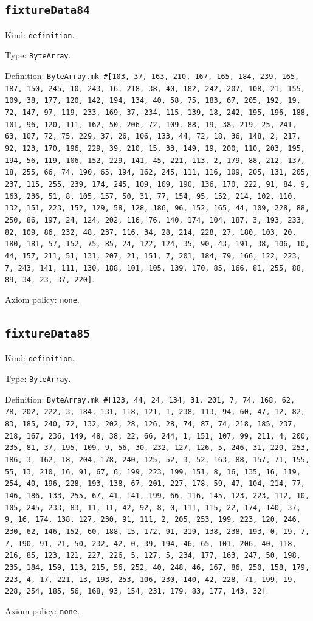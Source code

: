 \documentclass[11pt]{article}
\begin{document}
\subsection*{\texttt{fixtureData84}}
\noindent Kind: \texttt{definition}.\par
\noindent Type: \texttt{ByteArray}.\par
\noindent Definition: \texttt{ByteArray.mk \#[103, 37, 163, 210, 167, 165, 184, 239, 165, 187, 150, 245, 10, 243, 16, 218, 38, 40, 182, 242, 207, 108, 21, 155, 109, 38, 177, 120, 142, 194, 134, 40, 58, 75, 183, 67, 205, 192, 19, 72, 147, 97, 119, 233, 169, 37, 234, 115, 139, 18, 242, 195, 196, 188, 101, 96, 120, 111, 162, 50, 206, 72, 109, 88, 19, 38, 219, 25, 241, 63, 107, 72, 75, 229, 37, 26, 106, 133, 44, 72, 18, 36, 148, 2, 217, 92, 123, 170, 196, 229, 39, 210, 15, 33, 149, 19, 200, 110, 203, 195, 194, 56, 119, 106, 152, 229, 141, 45, 221, 113, 2, 179, 88, 212, 137, 18, 255, 66, 74, 190, 65, 194, 162, 245, 111, 116, 109, 205, 131, 205, 237, 115, 255, 239, 174, 245, 109, 109, 190, 136, 170, 222, 91, 84, 9, 163, 236, 51, 8, 105, 157, 50, 31, 77, 154, 95, 152, 214, 102, 110, 132, 151, 223, 152, 129, 58, 128, 186, 96, 152, 165, 44, 109, 228, 88, 250, 86, 197, 24, 124, 202, 116, 76, 140, 174, 104, 187, 3, 193, 233, 82, 109, 86, 232, 48, 237, 116, 34, 28, 214, 228, 27, 180, 103, 20, 180, 181, 57, 152, 75, 85, 24, 122, 124, 35, 90, 43, 191, 38, 106, 10, 44, 157, 211, 51, 131, 207, 21, 151, 7, 201, 184, 79, 166, 122, 223, 7, 243, 141, 111, 130, 188, 101, 105, 139, 170, 85, 166, 81, 255, 88, 89, 34, 23, 37, 220]}.\par
\noindent Axiom policy: \texttt{none}.\par
\subsection*{\texttt{fixtureData85}}
\noindent Kind: \texttt{definition}.\par
\noindent Type: \texttt{ByteArray}.\par
\noindent Definition: \texttt{ByteArray.mk \#[123, 44, 24, 134, 31, 201, 7, 74, 168, 62, 78, 202, 222, 3, 184, 131, 118, 121, 1, 238, 113, 94, 60, 47, 12, 82, 83, 185, 240, 72, 132, 202, 28, 126, 28, 74, 87, 74, 218, 185, 237, 218, 167, 236, 149, 48, 38, 22, 66, 244, 1, 151, 107, 99, 211, 4, 200, 235, 81, 37, 195, 109, 9, 56, 30, 232, 127, 126, 5, 246, 31, 220, 253, 186, 3, 162, 18, 204, 178, 240, 125, 52, 3, 52, 163, 88, 157, 71, 155, 55, 13, 210, 16, 91, 67, 6, 199, 223, 199, 151, 8, 16, 135, 16, 119, 254, 40, 196, 228, 193, 138, 67, 201, 227, 178, 59, 47, 104, 214, 77, 146, 186, 133, 255, 67, 41, 141, 199, 66, 116, 145, 123, 223, 112, 10, 105, 245, 233, 83, 11, 11, 42, 92, 8, 0, 111, 115, 22, 174, 140, 37, 9, 16, 174, 138, 127, 230, 91, 111, 2, 205, 253, 199, 223, 120, 246, 230, 62, 146, 152, 60, 188, 15, 172, 91, 219, 138, 238, 193, 0, 19, 7, 7, 190, 91, 21, 50, 232, 42, 0, 39, 194, 46, 65, 101, 206, 40, 118, 216, 85, 123, 121, 227, 226, 5, 127, 5, 234, 177, 163, 247, 50, 198, 235, 184, 159, 113, 215, 56, 252, 40, 248, 46, 167, 86, 250, 158, 179, 223, 4, 17, 221, 13, 193, 253, 106, 230, 140, 42, 228, 71, 199, 19, 228, 254, 185, 56, 168, 93, 154, 231, 179, 83, 177, 143, 32]}.\par
\noindent Axiom policy: \texttt{none}.\par
\end{document}

